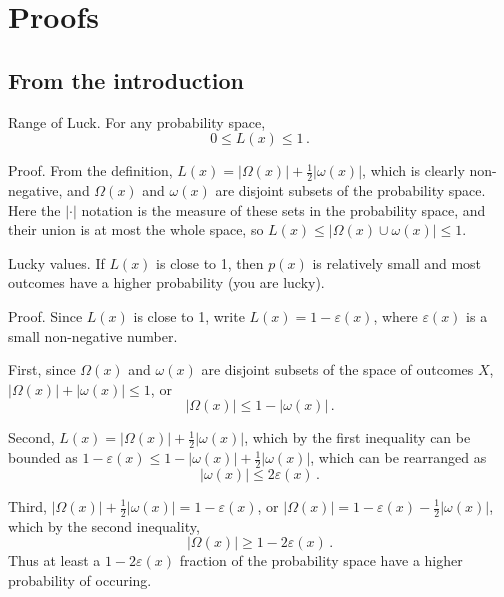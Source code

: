\chapter*{Proofs}


\section{From the introduction}

\begin{theorem}{Range of Luck.} 
For any probability space,
\begin{equation}
0 \leq L(x) \leq 1 \,.
\end{equation}

Proof.  From the definition, $L(x)=|\Omega(x)|+\frac{1}{2} |\omega(x)|$, which is clearly non-negative, and $\Omega(x)$ and $\omega(x)$ are disjoint subsets of the probability space.  Here the $| \cdot |$ notation is the measure of these sets in the probability space, and their union is at most the whole space, so $L(x) \leq |\Omega(x) \cup \omega(x)| \leq 1$.
\end{theorem}

\begin{theorem}{Lucky values.}
If $L(x)$ is close to 1, then $p(x)$ is relatively small and most outcomes have a higher probability (you are lucky).

Proof.  Since $L(x)$ is close to 1, write $L(x)=1-\varepsilon(x)$, where $\varepsilon(x)$ is a small non-negative number.

First, since $\Omega(x)$ and $\omega(x)$ are disjoint subsets of the space of outcomes $X$, $|\Omega(x)|+|\omega(x)| \leq 1$, or 
\begin{equation*}
|\Omega(x)| \leq 1-|\omega(x)| \,.
\end{equation*}

Second, $L(x)=|\Omega(x)|+\frac{1}{2}|\omega(x)|$, which by the first inequality can be bounded as $1-\varepsilon(x)\leq  1-|\omega(x)|+\frac{1}{2}|\omega(x)|$, which can be rearranged as
\begin{equation*}
|\omega(x)| \leq 2 \varepsilon(x) \,.
\end{equation*}

Third, $|\Omega(x)|+\frac{1}{2}|\omega(x)| = 1-\varepsilon(x)$, or $|\Omega(x)|=1-\varepsilon(x)-\frac{1}{2}|\omega(x)|$, which by the second inequality,
\begin{equation}
|\Omega(x)| \geq 1-2 \varepsilon(x) \,.
\end{equation}
Thus at least a $1-2 \varepsilon(x)$ fraction of the probability space have a higher probability of occuring.
\end{theorem}

